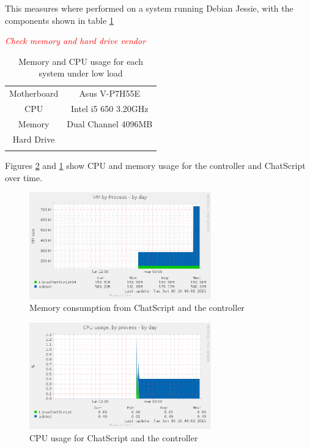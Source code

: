 This measures where performed on a system running Debian Jessie, with the components shown in table \ref{tab:systeminfo}

\emph{\textcolor{red}{Check memory and hard drive vendor}}
\begin{table}
  \centering
  \begin{tabular*}{0.5\textwidth}{| c | c |}
    \hhline{|-|-|}
    Motherboard & Asus V-P7H55E \\ \hhline{|-|-|} 
    CPU & Intel i5 650 3.20GHz  \\ \hhline{|-|-|} 
    Memory & Dual Channel 4096MB  \\ \hhline{|-|-|} 
    Hard Drive & \\ \hhline{|-|-|} 
    \end{tabular*}
  \caption{Memory and CPU usage for each system under low load}
  \label{tab:systeminfo}
\end{table}


Figures \ref{fig:cpuuse} and \ref{fig:memuse} show CPU and memory usage for the controller and ChatScript over time.


\begin{figure}[!htbp]
    \centering
    \includegraphics[width=0.7\textwidth]{img/test/memory_by_process.png}
    \caption{Memory consumption from ChatScript and the controller}
    \label{fig:memuse}
\end{figure}


\begin{figure}[!htbp]
    \centering
    \includegraphics[width=0.7\textwidth]{img/test/cpu_usage.png}
    \caption{CPU usage for ChatScript and the controller}
    \label{fig:cpuuse}
\end{figure}

